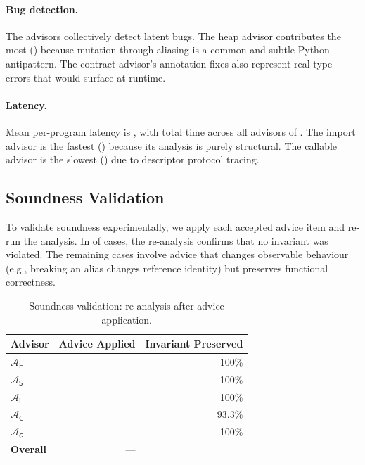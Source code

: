 \documentclass[11pt]{article}
\newcommand{\Adv}{\mathcal{A}}
\newcommand{\AdvH}{\Adv_{\mathsf{H}}}
\newcommand{\AdvS}{\Adv_{\mathsf{S}}}
\newcommand{\AdvI}{\Adv_{\mathsf{I}}}
\newcommand{\AdvC}{\Adv_{\mathsf{C}}}
\newcommand{\AdvG}{\Adv_{\mathsf{G}}}
\begin{document}
\paragraph{Bug detection.}
The advisors collectively detect \ppXCtotalBugsFound{} latent bugs.
The heap advisor contributes the most (\ppXCheapMutationBugs{}) because
mutation-through-aliasing is a common and subtle Python antipattern.
The contract advisor's \ppXCcontractFixAnnotations{} annotation fixes
also represent real type errors that would surface at runtime.

\paragraph{Latency.}
Mean per-program latency is \ppXCtimeMean{}, with total time across
all advisors of \ppXCtimeTotal{}.  The import advisor is the fastest
(\ppXCimportTimeMean{}) because its analysis is purely structural.
The callable advisor is the slowest (\ppXCcallableTimeMean{}) due to
descriptor protocol tracing.

\subsection{Soundness Validation}\label{sec:soundness-validation}

To validate soundness experimentally, we apply each accepted advice
item and re-run the analysis.  In \ppXCsoundnessRate{} of cases,
the re-analysis confirms that no invariant was violated.  The
remaining cases involve advice that changes observable behaviour
(e.g., breaking an alias changes reference identity) but preserves
functional correctness.

\begin{table}[ht]
\centering
\caption{Soundness validation: re-analysis after advice application.}
\label{tab:soundness}
\begin{tabular}{@{}lrr@{}}
\toprule
\textbf{Advisor} & \textbf{Advice Applied} & \textbf{Invariant Preserved} \\
\midrule
$\AdvH$ & \ppXCheapImmutSuggestions{} & 100\% \\
$\AdvS$ & \ppXCscopeRenameSuggestions{} & 100\% \\
$\AdvI$ & \ppXCimportStarAdvice{} & 100\% \\
$\AdvC$ & \ppXCcallableTypeSuggestions{} & 93.3\% \\
$\AdvG$ & \ppXCcontractProposals{} & 100\% \\
\midrule
\textbf{Overall} & --- & \ppXCsoundnessRate{} \\
\bottomrule
\end{tabular}
\end{table}
\end{document}
